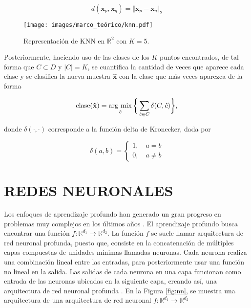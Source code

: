 \begin{equation}
    d(\mathbf{x}_p,\mathbf{x}_q) = \Vert \mathbf{x}_p-\mathbf{x}_q \Vert_2
    \label{eq:distancia_euclidiana}
\end{equation}

\begin{figure}[H]
    \centering
    \texttt{[image: images/marco\_teórico/knn.pdf]}
    \caption{\hspace{2mm}Representación de KNN en $\mathbb{R}^2$ con $K = 5$.}
    \label{fig:knn}
\end{figure}

Posteriormente, haciendo uso de las clases de los $K$ puntos encontrados, de tal forma que $C \subset D$ y $\vert C \vert = K$, se cuantifica la cantidad de veces que aparece cada clase y se clasifica la nueva muestra $\mathbf{\hat{x}}$ con la clase que más veces aparezca de la forma

\begin{equation}
    \mathrm{clase}(\mathbf{\hat{x}}) =  \operatorname*{arg \ mix}_{\hat{c}} \bigg\{ \sum_{\hat{c} \in C} \delta(C,\hat{c})\bigg\},
\end{equation}

donde $\delta(\cdot,\cdot)$ corresponde a la función delta de Kronecker, dada por

\begin{equation}
    \delta(a,b) = \begin{cases}
        1, \quad a = b \\
        0, \quad a \neq b
    \end{cases}
\end{equation}
\section{REDES NEURONALES}

Los enfoques de aprendizaje profundo han generado un gran progreso en problemas muy complejos en los últimos años
. El aprendizaje profundo busca encontrar una función $f: \mathbb{R}^{d_1} \rightarrow \mathbb{R}^{d_2}$. La función $f$ se suele llamar arquitectura de red neuronal profunda, puesto que, consiste en la concatenación de múltiples capas compuestas de unidades mínimas llamadas neuronas. Cada neurona realiza una combinación lineal entre las entradas, para posteriormente usar una función no lineal en la salida. Las salidas de cada neurona en una capa funcionan como entrada de las neuronas ubicadas en la siguiente capa, creando así, una arquitectura de red neuronal profunda . En la Figura \ref{fig:nn}, se muestra una arquitectura de una arquitectura de red neuronal $f: \mathbb{R}^{d_1} \rightarrow \mathbb{R}^{d_2}$

